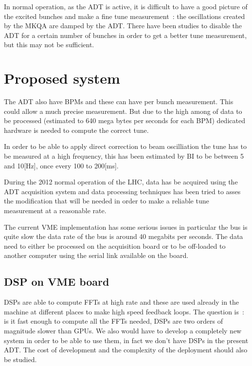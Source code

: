 In normal operation, as the \gls{ADT} is active, it is difficult to have a
good picture of the excited bunches and make a fine tune measurement~: the
oscillations created by the \gls{MKQA} are damped by the \gls{ADT}. There
have been studies to disable the \gls{ADT} for a certain number of bunches in
order to get a better tune measurement\cite{HofleEvian11}, but this may
not be sufficient.

\section{Proposed system}

The \gls{ADT} also have \glspl{BPM} and these can have per bunch 
measurement\cite{BphMeas07}. This could allow a much precise measurement. But due 
to the high among of data to be processed (estimated to 640 mega bytes per 
seconds for each \gls{BPM}) dedicated hardware is needed to compute the 
correct tune\cite{HofleChamonix12}.

In order to be able to apply direct correction to beam oscilliation the 
\gls{tune} has to be measured at a high frequency, this has been estimated by
\gls{BI} to be between 5 and 10[Hz], once every 100 to 200[ms].

During the 2012 normal operation of the \gls{LHC}, data has be acquired using
the \gls{ADT} acquisition system and data processing techniques has been 
tried to asses the modification that will be needed in order to make a 
reliable \gls{tune} measurement at a reasonable rate\cite{HofleChamonix12}.

The current \gls{VME} implementation has some serious issues in particular 
the bus is quite slow the data rate of the bus is around 40 megabits per 
seconds. The data need to either be processed on the acquisition board or 
to be off-loaded to another computer using the serial link available on the 
board\cite{Baudrenghien:1124094}.

\subsection{DSP on VME board}

\Glspl{DSP} are able to compute \glspl{FFT} at high rate and these are used
already in the machine at different places to make high speed feedback loops.
The question is~: is it fast enough to compute all the \glspl{FFT} needed, 
\glspl{DSP} are two orders of magnitude slower than \glspl{GPU}. We also 
would have to develop a completely new system in order to be able to use them, 
in fact we don't have \glspl{DSP} in the present \gls{ADT}. The cost of 
development and the complexity of the deployment should also be studied.

